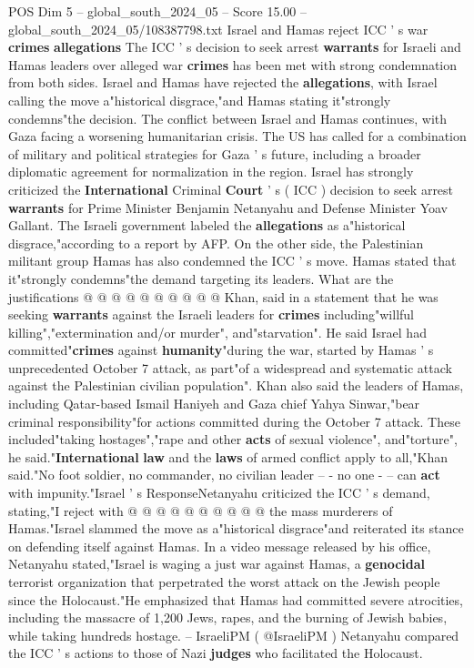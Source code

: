 \begin{textsample}{POS Dim 5 – global\_south\_2024\_05 – Score 15.00 – global\_south\_2024\_05/108387798.txt}  \label{ex:f5_pos_077}
Israel and Hamas reject ICC ' s war \textbf{crimes} \textbf{allegations} The ICC ' s decision to seek arrest \textbf{warrants} for Israeli and Hamas leaders over alleged war \textbf{crimes} has been met with strong condemnation from both sides.
Israel and Hamas have rejected the \textbf{allegations}, with Israel calling the move a"historical disgrace,"and Hamas stating it"strongly condemns"the decision.
The conflict between Israel and Hamas continues, with Gaza facing a worsening humanitarian crisis.
The US has called for a combination of military and political strategies for Gaza ' s future, including a broader diplomatic agreement for normalization in the region.
Israel has strongly criticized the \textbf{International} Criminal \textbf{Court} ' s ( ICC ) decision to seek arrest \textbf{warrants} for Prime Minister Benjamin Netanyahu and Defense Minister Yoav Gallant.
The Israeli government labeled the \textbf{allegations} as a"historical disgrace,"according to a report by AFP.
On the other side, the Palestinian militant group Hamas has also condemned the ICC ' s move.
Hamas stated that it"strongly condemns"the demand targeting its leaders.
What are the justifications @ @ @ @ @ @ @ @ @ @ Khan, said in a statement that he was seeking \textbf{warrants} against the Israeli leaders for \textbf{crimes} including"willful killing","extermination and/or murder", and"starvation".
He said Israel had committed"\textbf{crimes} against \textbf{humanity}"during the war, started by Hamas ' s unprecedented October 7 attack, as part"of a widespread and systematic attack against the Palestinian civilian population".
Khan also said the leaders of Hamas, including Qatar-based Ismail Haniyeh and Gaza chief Yahya Sinwar,"bear criminal responsibility"for actions committed during the October 7 attack.
These included"taking hostages","rape and other \textbf{acts} of sexual violence", and"torture", he said."\textbf{International} \textbf{law} and the \textbf{laws} of armed conflict apply to all,"Khan said."No foot soldier, no commander, no civilian leader -- - no one - -- can \textbf{act} with impunity."Israel ' s ResponseNetanyahu criticized the ICC ' s demand, stating,"I reject with @ @ @ @ @ @ @ @ @ @ the mass murderers of Hamas."Israel slammed the move as a"historical disgrace"and reiterated its stance on defending itself against Hamas.
In a video message released by his office, Netanyahu stated,"Israel is waging a just war against Hamas, a \textbf{genocidal} terrorist organization that perpetrated the worst attack on the Jewish people since the Holocaust."He emphasized that Hamas had committed severe atrocities, including the massacre of 1,200 Jews, rapes, and the burning of Jewish babies, while taking hundreds hostage. -- IsraeliPM ( @IsraeliPM ) Netanyahu compared the ICC ' s actions to those of Nazi \textbf{judges} who facilitated the Holocaust.

\end{textsample}
